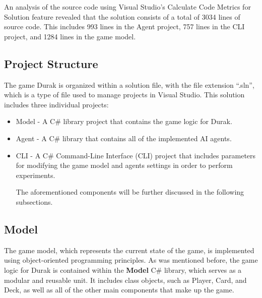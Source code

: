 An analysis of the source code using Visual Studio's Calculate Code Metrics for Solution feature revealed that the solution consists of a total of 3034 lines of source code. This includes 993 lines in the Agent project, 757 lines in the CLI project, and 1284 lines in the game model.

\subsection{Project Structure}
The game Durak is organized within a solution file, with the file extension ``.sln'', which is a type of file used to manage projects in Visual Studio. This solution includes three individual projects: 

\begin{itemize}

\item Model - A C\# library project that contains the game logic for Durak.

\item Agent - A C\# library that contains all of the implemented AI agents.

\item CLI - A C\# Command-Line Interface (CLI) project that includes parameters for modifying the game model and agents settings in order to perform experiments.

The aforementioned components will be further discussed in the following subsections.

\end{itemize}

\subsection{Model}

The game model, which represents the current state of the game, is implemented using object-oriented programming principles. As was mentioned before, the game logic for Durak is contained within the \textbf{Model} C\# library, which serves as a modular and reusable unit. It includes class objects, such as Player, Card, and Deck, as well as all of the other main components that make up the game. 

